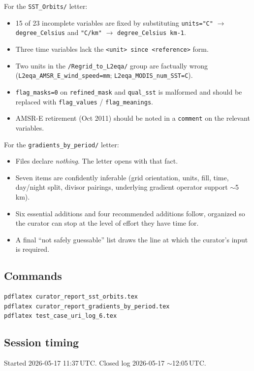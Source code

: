 \documentclass[11pt]{article}
\begin{document}
For the \texttt{SST\_Orbits/} letter:
\begin{itemize}
  \item 15 of 23 incomplete variables are fixed by substituting
    \texttt{units="C"} $\to$ \texttt{degree\_Celsius} and
    \texttt{"C/km"} $\to$ \texttt{degree\_Celsius km-1}.
  \item Three time variables lack the
    \texttt{<unit> since <reference>} form.
  \item Two units in the \texttt{/Regrid\_to\_L2eqa/} group are
    factually wrong
    (\texttt{L2eqa\_AMSR\_E\_wind\_speed=mm};
    \texttt{L2eqa\_MODIS\_num\_SST=C}).
  \item \texttt{flag\_masks=0} on \texttt{refined\_mask} and
    \texttt{qual\_sst} is malformed and should be replaced with
    \texttt{flag\_values} / \texttt{flag\_meanings}.
  \item AMSR-E retirement (Oct 2011) should be noted in a
    \texttt{comment} on the relevant variables.
\end{itemize}

For the \texttt{gradients\_by\_period/} letter:
\begin{itemize}
  \item Files declare \emph{nothing}. The letter opens with that
    fact.
  \item Seven items are confidently inferable (grid orientation,
    units, fill, time, day/night split, divisor pairings,
    underlying gradient operator support $\sim$5 km).
  \item Six essential additions and four recommended additions
    follow, organized so the curator can stop at the level of
    effort they have time for.
  \item A final ``not safely guessable'' list draws the line at
    which the curator's input is required.
\end{itemize}

\subsection{Commands}

\begin{lstlisting}
pdflatex curator_report_sst_orbits.tex
pdflatex curator_report_gradients_by_period.tex
pdflatex test_case_uri_log_6.tex
\end{lstlisting}

\subsection{Session timing}

Started 2026-05-17 11:37\,UTC. Closed log 2026-05-17
$\sim$12:05\,UTC.
\end{document}

